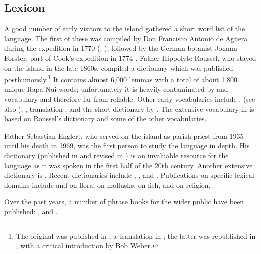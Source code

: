 \subsection{Lexicon}\label{sec:1.5.1}

A good number of early visitors to the island gathered a short word list of the language. The first of these was compiled by Don Francisco Antonio de Agüera during the  expedition in 1770 (\citealt{Ross1937}; \citealt{Corney1908}), followed by the German botanist Johann Forster, part of Cook’s expedition in 1774 \citep{Schuhmacher1977}. Father Hippolyte Roussel, who stayed on the island in the late 1860s, compiled a dictionary which was published posthumously.\footnote{\label{fn:24}The  original was published in \citet{Roussel1908}, a  translation in \citet{Roussel1917}; the latter was republished in \citet{Foerster2013}, with a critical introduction by Bob Weber.} It contains almost 6,000  lemmas with a total of about 1,800 unique Rapa Nui words; unfortunately it is heavily contaminated by  and  vocabulary \citep{Fischer1992} and therefore far from reliable. Other early vocabularies include \citet{Philippi1873}, \citet{Geiseler1883} (see also \citealt{AyresAyres1995}), \citet{Thomson1889},  translation \citet{Thomson1980}, \citet{Cooke1899} and the short dictionary by \citet{Martínez1913}. The extensive vocabulary in \citet{Churchill1912} is based on Roussel’s dictionary and some of the other vocabularies.

Father Sebastian Englert, who served on the island as parish priest from 1935 until his death in 1969, was the first person to study the language in depth. His dictionary (published in \citealt{Englert1948} and revised in \citealt{Englert1978}) is an invaluable resource for the language as it was spoken in the first half of the 20th century. Another extensive dictionary is \citet{Fuentes1960}. Recent dictionaries include \citet{Fedorova1988}, \citet{ConteOliveros2000}, \citet{HernándezSallés2001} and \citet{HotusChavez2008}. Publications on specific lexical domains include \citet{Gunckel1968} and \citet{RauchIbañez1996} on flora, \citet{PinochetCarte1980} on mollusks, \citet{RandallEgaña1984} on fish, and \citet{BierbachCain1996} on religion.

Over the past years, a number of phrase books for the wider public have been published: \citet{HaoaRapahangoLiller1996}, \citet{HotusTuki2001} and \citet{PaulyHukeAtán2008}.

